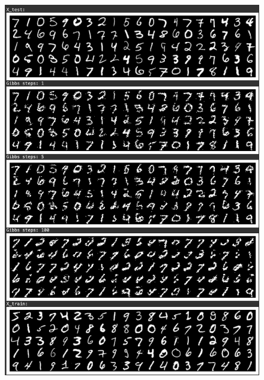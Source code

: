 \begin{figure}[h!]
\begin{minipage}[t]{0.19\textwidth}
        \includegraphics[width=\textwidth]{figures/rbm-generation.png}
    \end{minipage}
    \hfill
    \begin{minipage}[t]{0.19\textwidth}

\end{minipage}
\end{figure}
